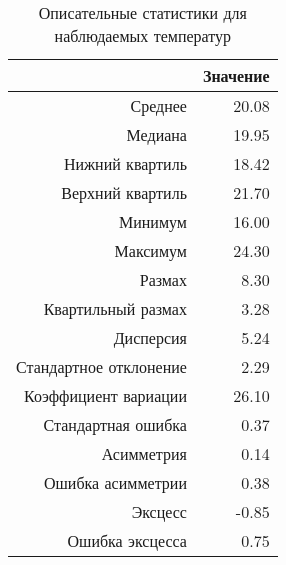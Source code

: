\begin{table}[ht]
\centering
\begin{tabular}{rr}
  \hline
 & Значение \\ 
  \hline
Среднее & 20.08 \\ 
  Медиана & 19.95 \\ 
  Нижний квартиль & 18.42 \\ 
  Верхний квартиль & 21.70 \\ 
  Минимум & 16.00 \\ 
  Максимум & 24.30 \\ 
  Размах & 8.30 \\ 
  Квартильный размах & 3.28 \\ 
  Дисперсия & 5.24 \\ 
  Стандартное отклонение & 2.29 \\ 
  Коэффициент вариации & 26.10 \\ 
  Стандартная ошибка & 0.37 \\ 
  Асимметрия & 0.14 \\ 
  Ошибка асимметрии & 0.38 \\ 
  Эксцесс & -0.85 \\ 
  Ошибка эксцесса & 0.75 \\ 
   \hline
\end{tabular}
\caption{Описательные статистики для наблюдаемых температур} 
\label{table:dstats}
\end{table}
